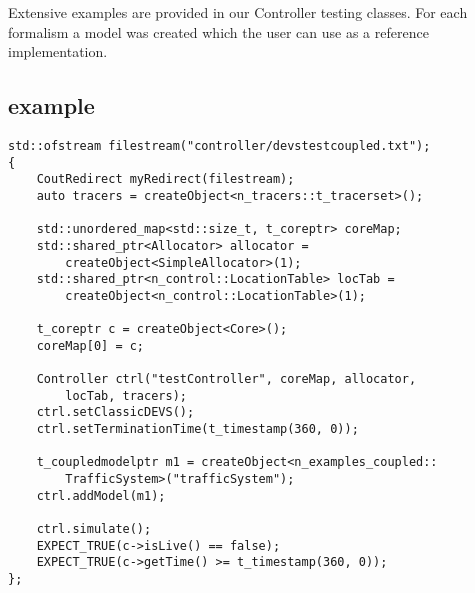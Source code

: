 Extensive examples are provided in our Controller testing classes. For each formalism a model was created which the user can use as a reference implementation.\\

\subsection{example}

\begin{lstlisting}
std::ofstream filestream("controller/devstestcoupled.txt");
{
	CoutRedirect myRedirect(filestream);
	auto tracers = createObject<n_tracers::t_tracerset>();
	
	std::unordered_map<std::size_t, t_coreptr> coreMap;
	std::shared_ptr<Allocator> allocator = 
		createObject<SimpleAllocator>(1);
	std::shared_ptr<n_control::LocationTable> locTab = 
		createObject<n_control::LocationTable>(1);
	
	t_coreptr c = createObject<Core>();
	coreMap[0] = c;
	
	Controller ctrl("testController", coreMap, allocator, 
		locTab, tracers);
	ctrl.setClassicDEVS();
	ctrl.setTerminationTime(t_timestamp(360, 0));
	
	t_coupledmodelptr m1 = createObject<n_examples_coupled::
		TrafficSystem>("trafficSystem");
	ctrl.addModel(m1);
	
	ctrl.simulate();
	EXPECT_TRUE(c->isLive() == false);
	EXPECT_TRUE(c->getTime() >= t_timestamp(360, 0));
};
\end{lstlisting}